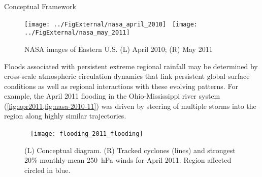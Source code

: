 \begin{block}{Conceptual Framework}
    \begin{figure}
        \texttt{[image: ../FigExternal/nasa\_april\_2010]}~
        \texttt{[image: ../FigExternal/nasa\_may\_2011]}
        \caption{NASA images of Eastern U.S. (L) April 2010; (R) May 2011}
        \label{fig:nasa-2010-11}
    \end{figure}
    Floods associated with persistent extreme regional rainfall may be determined by cross-scale atmospheric circulation dynamics that link persistent global surface conditions as well as regional interactions with these evolving patterns.
    For example, the April 2011 flooding in the Ohio-Mississippi river system (\cref{fig:apr2011,fig:nasa-2010-11}) was driven by steering of multiple storms into the region along highly similar trajectories.
    \begin{figure}
        ~\hfill
        \texttt{[image: flooding\_2011\_flooding]}
        \caption{(L) Conceptual diagram. (R) Tracked cyclones (lines) and strongest 20\% monthly-mean \SI{250}{\hecto\pascal} winds for April 2011. Region affected circled in blue.}
        \label{fig:apr2011}
    \end{figure}
\end{block}
